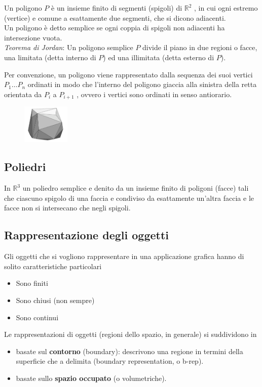 \documentclass[a4paper, 10pt]{article}
\newcommand{\numberset}{\mathbb}
\newcommand{\R}{\numberset{R}}
\begin{document}
		Un poligono $ P $ è un insieme finito di segmenti (spigoli) di $ \R^2 $ , in
		cui ogni estremo (vertice) e comune a esattamente due
		segmenti, che si dicono adiacenti.\\
		Un poligono è detto semplice se ogni coppia di spigoli non
		adiacenti ha intersezione vuota.\\
		\textit{Teorema di Jordan}: Un poligono semplice $ P $ divide il piano in
		due regioni o facce, una limitata (detta interno di $ P $) ed una
		illimitata (detta esterno di $ P $).
		
		\noindent
		Per convenzione, un poligono viene rappresentato dalla
		sequenza dei suoi vertici $ P_1 \dots P_n $ ordinati in modo che l'interno
		del poligono giaccia alla sinistra della retta orientata da $ P_i $ a
		$ P_{i+1} $ , ovvero i vertici sono ordinati in senso antiorario.
		
		\begin{figure}
			\includegraphics[width=0.2\textwidth, ]{poliedro}
		\end{figure}
		\noindent
	\subsection{Poliedri}
	
		In $ \R^3 $ un poliedro semplice e denito da un insieme finito di
		poligoni (facce) tali che ciascuno spigolo di una faccia e condiviso
		da esattamente un'altra faccia e le facce non si intersecano che
		negli spigoli.
		
	\subsection{Rappresentazione degli oggetti}
		Gli oggetti che si vogliono rappresentare in una applicazione
		grafica hanno di solito caratteristiche particolari
		\begin{itemize}
			\item Sono finiti
			\item Sono chiusi (non sempre)
			\item Sono continui
		\end{itemize}
		Le rappresentazioni di oggetti (regioni dello spazio, in
		generale) si suddividono in
		\begin{itemize}
			\item basate sul \textbf{contorno} (boundary): descrivono una regione in
		termini della superficie che a delimita (boundary representation, o
		b-rep).
			\item basate sullo \textbf{spazio occupato} (o volumetriche).
		\end{itemize}
		
\end{document}
